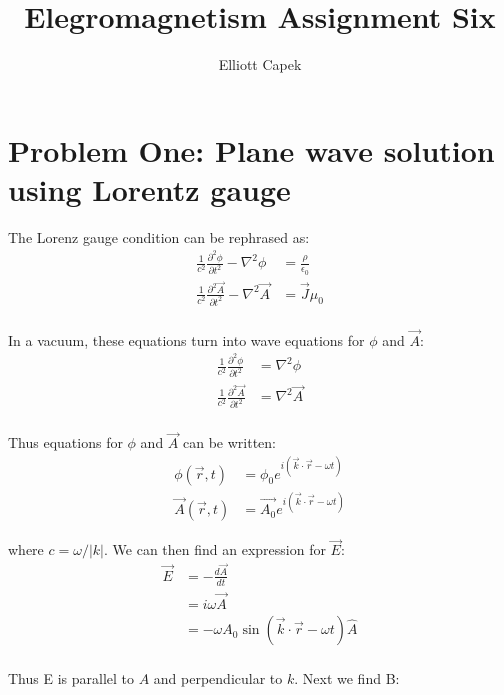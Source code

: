 \documentclass[10pt]{article} %
\title{Elegromagnetism Assignment Six}
\author{Elliott Capek}
\begin{document}
\maketitle{}

\section{Problem One: Plane wave solution using Lorentz gauge}
The Lorenz gauge condition can be rephrased as:\\

\begin{align*}
  \frac{1}{c^2}\frac{\partial^2\phi}{\partial t^2} - \nabla^2 \phi &= \frac{\rho}{\epsilon_0}\\
  \frac{1}{c^2}\frac{\partial^2\vec{A}}{\partial t^2} - \nabla^2 \vec{A} &= \vec{J}\mu_0\\
\end{align*}

In a vacuum, these equations turn into wave equations for $\phi$ and $\vec{A}$:\\

\begin{align*}
  \frac{1}{c^2}\frac{\partial^2\phi}{\partial t^2} &= \nabla^2 \phi\\
  \frac{1}{c^2}\frac{\partial^2\vec{A}}{\partial t^2} &= \nabla^2 \vec{A}\\
\end{align*}

Thus equations for $\phi$ and $\vec{A}$ can be written:\\

\begin{align*}
  \phi(\vec{r},t) &= \phi_0e^{i\left(\vec{k}\cdot\vec{r} -\omega t\right)}\\
  \vec{A}(\vec{r},t) &= \vec{A_0}e^{i\left(\vec{k}\cdot\vec{r} -\omega t\right)}
\end{align*}

where $c=\omega/|k|$. We can then find an expression for $\vec{E}$:\\

\begin{align*}
  \vec{E} &= -\frac{d\vec{A}}{dt}\\
  &= i\omega\vec{A}\\
  &= -\omega A_0\sin(\vec{k}\cdot\vec{r}-\omega t)\hat{A}\\
\end{align*}

Thus E is parallel to $A$ and perpendicular to $k$. Next we find B:\\
\end{document}
